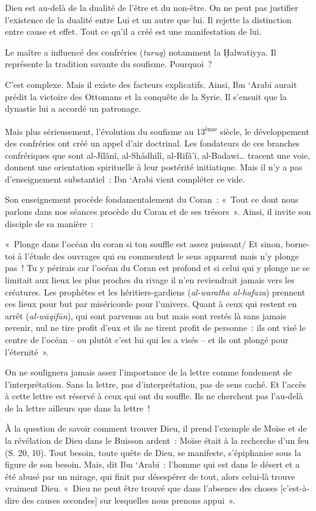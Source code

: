 Dieu est au-delà de la dualité de l'être et du non-être. On ne peut pas
justifier l'existence de la dualité entre Lui et un autre que lui. Il
rejette la distinction entre cause et effet. Tout ce qu'il a créé est
une manifestation de lui.

Le maître a influencé des confréries (\emph{turuq}) notamment la
Ḫalwatiyya. Il représente la tradition savante du soufisme. Pourquoi~?

C'est complexe. Mais il existe des facteurs explicatifs. Ainsi, Ibn
`Arabī aurait prédit la victoire des Ottomans et la conquête de la
Syrie. Il s'ensuit que la dynastie lui a accordé un patronage.

Mais plus sérieusement, l'évolution du soufisme au
13\textsuperscript{ème} siècle, le développement des confréries ont créé
un appel d'air doctrinal. Les fondateurs de ces branches confrériques
que sont al-Jîlânî, al-Shâdhilî, al-Rifâ'ī, al-Badawi\ldots{} tracent
une voie, donnent une orientation spirituelle à leur postérité
initiatique. Mais il n'y a pas d'enseignement substantiel~: Ibn `Arabi
vient compléter ce vide.

Son enseignement procède fondamentalement du Coran~: «~Tout ce dont nous
parlons dans nos séances procède du Coran et de ses
trésors~». Ainsi, il invite son disciple
de sa manière~:

«~Plonge dans l'océan du coran si ton souffle est assez puissant/ Et
sinon, borne-toi à l'étude des ouvrages qui en commentent le sens
apparent mais n'y plonge pas~! Tu y périrais car l'océan du Coran est
profond et si celui qui y plonge ne se limitait aux lieux les plus
proches du rivage il n'en reviendrait jamais vers les créatures. Les
prophètes et les héritiers-gardiens (\emph{al-waratha al-hafaza})
prennent ces lieux pour but par miséricorde pour l'univers. Quant à ceux
qui restent en arrêt (\emph{al-wāqīfūn}), qui sont parvenus au but mais
sont restés là sans jamais revenir, nul ne tire profit d'eux et ils ne
tirent profit de personne~: ils ont visé le centre de l'océan -- ou
plutôt c'est lui qui les a visés -- et ils ont plongé pour
l'éternité~».

On ne soulignera jamais assez l'importance de la lettre comme fondement
de l'interprétation. Sans la lettre, pas d'interprétation, pas de sens
caché. Et l'accès à cette lettre est réservé à ceux qui ont du souffle.
Ils ne cherchent pas l'au-delà de la lettre ailleurs que dans la
lettre~!

À la question de savoir comment trouver Dieu, il prend l'exemple de
Moïse et de la révélation de Dieu dans le Buisson ardent~: Moïse était à
la recherche d'un feu (S. 20, 10). Tout besoin, toute quête de Dieu, se
manifeste, s'épiphanise sous la figure de son besoin. Mais, dit Ibn
`Arabī~: l'homme qui est dans le désert et a été abusé par un mirage,
qui finit par désespérer de tout, alors celui-là trouve vraiment
Dieu. «~Dieu ne peut être trouvé que dans
l'absence des choses {[}c'est-à-dire des causes secondes{]} sur
lesquelles nous prenons appui~».

